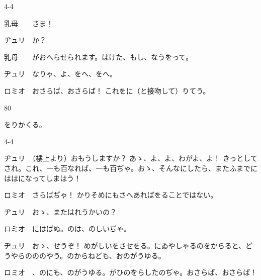 \documentclass[tate,paper=b6j,jafontsize=9pt]{jlreq}
\begin{document}
\begin{azconvIndented}{4\zw}{-4\zw}

乳母　　さま！

ヂュリ　か？

乳母　　がおへらせられます。はけた、もし、なうをって。

ヂュリ　なりゃ、よ、をへ、をへ。

ロミオ　おさらば、おさらば！ これをに（と接吻して）りてう。

\end{azconvIndented}
\begin{azconvIndented}{8\zw}{0\zw}

をりかくる。

\end{azconvIndented}
\begin{azconvIndented}{4\zw}{-4\zw}

ヂュリ　（樓上より）おもうしますか？ あゝ、よ、よ、わがよ、よ！ きっとしてされ。これ、一も百なれば、一も百ぢゃ。おゝ、そんなにしたら、またふまでにははになってしまはう！

ロミオ　さらばぢゃ！ かりそめにもさへあればをることではない。

ヂュリ　おゝ、またはれうかいの？

ロミオ　にはばぬ。のは、のしいぢゃ。

ヂュリ　おゝ、せうぞ！ めがしいをさせをる。にゐやしゃるのをからると、どうやらのののやう。のからねども、おのがうゆる。

ロミオ　、のにも、のがうゆる。がひのをらしたのぢゃ。おさらば、おさらば！

\end{azconvIndented}
\end{document}
